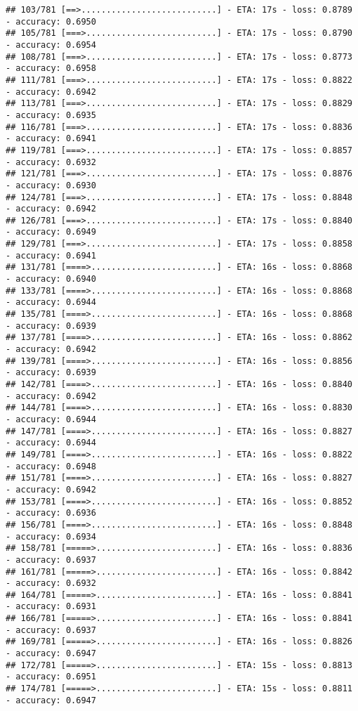 \documentclass[
]{article}
\begin{document}
\begin{verbatim}
## 103/781 [==>...........................] - ETA: 17s - loss: 0.8789 - accuracy: 0.6950
## 105/781 [===>..........................] - ETA: 17s - loss: 0.8790 - accuracy: 0.6954
## 108/781 [===>..........................] - ETA: 17s - loss: 0.8773 - accuracy: 0.6958
## 111/781 [===>..........................] - ETA: 17s - loss: 0.8822 - accuracy: 0.6942
## 113/781 [===>..........................] - ETA: 17s - loss: 0.8829 - accuracy: 0.6935
## 116/781 [===>..........................] - ETA: 17s - loss: 0.8836 - accuracy: 0.6941
## 119/781 [===>..........................] - ETA: 17s - loss: 0.8857 - accuracy: 0.6932
## 121/781 [===>..........................] - ETA: 17s - loss: 0.8876 - accuracy: 0.6930
## 124/781 [===>..........................] - ETA: 17s - loss: 0.8848 - accuracy: 0.6942
## 126/781 [===>..........................] - ETA: 17s - loss: 0.8840 - accuracy: 0.6949
## 129/781 [===>..........................] - ETA: 17s - loss: 0.8858 - accuracy: 0.6941
## 131/781 [====>.........................] - ETA: 16s - loss: 0.8868 - accuracy: 0.6940
## 133/781 [====>.........................] - ETA: 16s - loss: 0.8868 - accuracy: 0.6944
## 135/781 [====>.........................] - ETA: 16s - loss: 0.8868 - accuracy: 0.6939
## 137/781 [====>.........................] - ETA: 16s - loss: 0.8862 - accuracy: 0.6942
## 139/781 [====>.........................] - ETA: 16s - loss: 0.8856 - accuracy: 0.6939
## 142/781 [====>.........................] - ETA: 16s - loss: 0.8840 - accuracy: 0.6942
## 144/781 [====>.........................] - ETA: 16s - loss: 0.8830 - accuracy: 0.6944
## 147/781 [====>.........................] - ETA: 16s - loss: 0.8827 - accuracy: 0.6944
## 149/781 [====>.........................] - ETA: 16s - loss: 0.8822 - accuracy: 0.6948
## 151/781 [====>.........................] - ETA: 16s - loss: 0.8827 - accuracy: 0.6942
## 153/781 [====>.........................] - ETA: 16s - loss: 0.8852 - accuracy: 0.6936
## 156/781 [====>.........................] - ETA: 16s - loss: 0.8848 - accuracy: 0.6934
## 158/781 [=====>........................] - ETA: 16s - loss: 0.8836 - accuracy: 0.6937
## 161/781 [=====>........................] - ETA: 16s - loss: 0.8842 - accuracy: 0.6932
## 164/781 [=====>........................] - ETA: 16s - loss: 0.8841 - accuracy: 0.6931
## 166/781 [=====>........................] - ETA: 16s - loss: 0.8841 - accuracy: 0.6937
## 169/781 [=====>........................] - ETA: 16s - loss: 0.8826 - accuracy: 0.6947
## 172/781 [=====>........................] - ETA: 15s - loss: 0.8813 - accuracy: 0.6951
## 174/781 [=====>........................] - ETA: 15s - loss: 0.8811 - accuracy: 0.6947

\end{verbatim}
\end{document}
